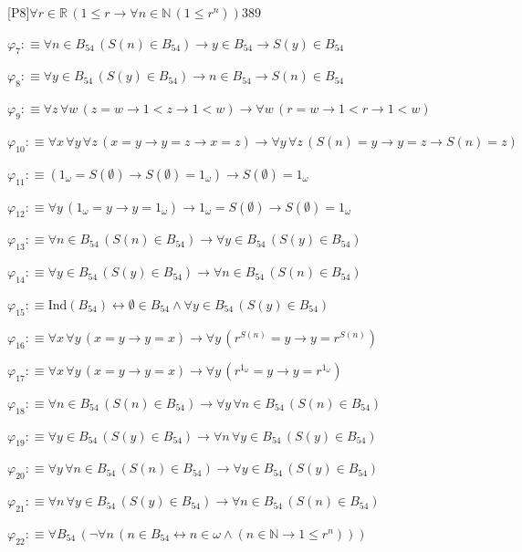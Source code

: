 \begin{fullproof}{[P8]}{$\forall r \in \mathbb{R}\,(1 \leq r \to \forall n \in \mathbb{N}\,(1 \leq {{r}^{n}}))$}{389}
\begin{abbrevlist}
\item $\varphi_{7} :\equiv \forall n \in B_{54}\,(S(n) \in B_{54}) \to y \in B_{54} \to S(y) \in B_{54}$
\item $\varphi_{8} :\equiv \forall y \in B_{54}\,(S(y) \in B_{54}) \to n \in B_{54} \to S(n) \in B_{54}$
\item $\varphi_{9} :\equiv \forall z\,\forall w\,(z = w \to 1 < z \to 1 < w) \to \forall w\,(r = w \to 1 < r \to 1 < w)$
\item $\varphi_{10} :\equiv \forall x\,\forall y\,\forall z\,(x = y \to y = z \to x = z) \to \forall y\,\forall z\,(S(n) = y \to y = z \to S(n) = z)$
\item $\varphi_{11} :\equiv (1_{\omega} = S(\emptyset) \to S(\emptyset) = 1_{\omega}) \to S(\emptyset) = 1_{\omega}$
\item $\varphi_{12} :\equiv \forall y\,(1_{\omega} = y \to y = 1_{\omega}) \to 1_{\omega} = S(\emptyset) \to S(\emptyset) = 1_{\omega}$
\item $\varphi_{13} :\equiv \forall n \in B_{54}\,(S(n) \in B_{54}) \to \forall y \in B_{54}\,(S(y) \in B_{54})$
\item $\varphi_{14} :\equiv \forall y \in B_{54}\,(S(y) \in B_{54}) \to \forall n \in B_{54}\,(S(n) \in B_{54})$
\item $\varphi_{15} :\equiv \mathrm{Ind}(B_{54}) \leftrightarrow \emptyset \in B_{54} \land \forall y \in B_{54}\,(S(y) \in B_{54})$
\item $\varphi_{16} :\equiv \forall x\,\forall y\,(x = y \to y = x) \to \forall y\,({{r}^{S(n)}} = y \to y = {{r}^{S(n)}})$
\item $\varphi_{17} :\equiv \forall x\,\forall y\,(x = y \to y = x) \to \forall y\,({{r}^{1_{\omega}}} = y \to y = {{r}^{1_{\omega}}})$
\item $\varphi_{18} :\equiv \forall n \in B_{54}\,(S(n) \in B_{54}) \to \forall y\,\forall n \in B_{54}\,(S(n) \in B_{54})$
\item $\varphi_{19} :\equiv \forall y \in B_{54}\,(S(y) \in B_{54}) \to \forall n\,\forall y \in B_{54}\,(S(y) \in B_{54})$
\item $\varphi_{20} :\equiv \forall y\,\forall n \in B_{54}\,(S(n) \in B_{54}) \to \forall y \in B_{54}\,(S(y) \in B_{54})$
\item $\varphi_{21} :\equiv \forall n\,\forall y \in B_{54}\,(S(y) \in B_{54}) \to \forall n \in B_{54}\,(S(n) \in B_{54})$
\item $\varphi_{22} :\equiv \forall B_{54}\,(\neg \forall n\,(n \in B_{54} \leftrightarrow n \in \omega \land (n \in \mathbb{N} \to 1 \leq {{r}^{n}})))$

\end{abbrevlist}
\end{fullproof}
